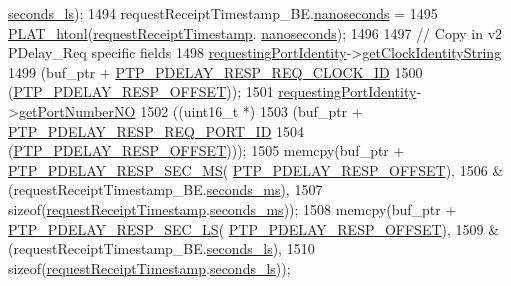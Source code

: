 \begin{DoxyCode}
      \hyperlink{class_timestamp_a2bf200e58cd268d8b86cf93c51500a44}{seconds\_ls});
1494     requestReceiptTimestamp\_BE.\hyperlink{class_timestamp_a78ae11d98fcfe738239d0a853d82c84a}{nanoseconds} =
1495         \hyperlink{linux_2src_2platform_8cpp_a8bf9e45ac3e41441f0e139139241c19d}{PLAT\_htonl}(\hyperlink{class_p_t_p_message_path_delay_resp_a981c3fe148ecddf9f1091675650ccd48}{requestReceiptTimestamp}.
      \hyperlink{class_timestamp_a78ae11d98fcfe738239d0a853d82c84a}{nanoseconds});
1496 
1497     \textcolor{comment}{// Copy in v2 PDelay\_Req specific fields}
1498     \hyperlink{class_p_t_p_message_path_delay_resp_a27e69c7fb521ebffca13229a7c4658ce}{requestingPortIdentity}->\hyperlink{class_port_identity_a2047fe8013d08f14ac579d604e2efd7e}{getClockIdentityString}
1499       (buf\_ptr + \hyperlink{avbts__message_8hpp_a9c01e5eff56f505aca3f6f3deb6c34f1}{PTP\_PDELAY\_RESP\_REQ\_CLOCK\_ID}
1500        (\hyperlink{avbts__message_8hpp_a7c20f0e32d4408c124fa9e115ab32cf3}{PTP\_PDELAY\_RESP\_OFFSET}));
1501     \hyperlink{class_p_t_p_message_path_delay_resp_a27e69c7fb521ebffca13229a7c4658ce}{requestingPortIdentity}->\hyperlink{class_port_identity_ae22242effe1001dc666522e6019fd494}{getPortNumberNO}
1502         ((uint16\_t *)
1503          (buf\_ptr + \hyperlink{avbts__message_8hpp_a1c5ac861894d1195aa57f60ef085798d}{PTP\_PDELAY\_RESP\_REQ\_PORT\_ID}
1504           (\hyperlink{avbts__message_8hpp_a7c20f0e32d4408c124fa9e115ab32cf3}{PTP\_PDELAY\_RESP\_OFFSET})));
1505     memcpy(buf\_ptr + \hyperlink{avbts__message_8hpp_a5afc93370bc70d23f95f2acbe53749d8}{PTP\_PDELAY\_RESP\_SEC\_MS}(
      \hyperlink{avbts__message_8hpp_a7c20f0e32d4408c124fa9e115ab32cf3}{PTP\_PDELAY\_RESP\_OFFSET}),
1506            &(requestReceiptTimestamp\_BE.\hyperlink{class_timestamp_a5d98378d782519e6f9c17db70f1620f0}{seconds\_ms}),
1507            \textcolor{keyword}{sizeof}(\hyperlink{class_p_t_p_message_path_delay_resp_a981c3fe148ecddf9f1091675650ccd48}{requestReceiptTimestamp}.\hyperlink{class_timestamp_a5d98378d782519e6f9c17db70f1620f0}{seconds\_ms}));
1508     memcpy(buf\_ptr + \hyperlink{avbts__message_8hpp_a8a6d2e369c19399ba34d40de83e3d318}{PTP\_PDELAY\_RESP\_SEC\_LS}(
      \hyperlink{avbts__message_8hpp_a7c20f0e32d4408c124fa9e115ab32cf3}{PTP\_PDELAY\_RESP\_OFFSET}),
1509            &(requestReceiptTimestamp\_BE.\hyperlink{class_timestamp_a2bf200e58cd268d8b86cf93c51500a44}{seconds\_ls}),
1510            \textcolor{keyword}{sizeof}(\hyperlink{class_p_t_p_message_path_delay_resp_a981c3fe148ecddf9f1091675650ccd48}{requestReceiptTimestamp}.\hyperlink{class_timestamp_a2bf200e58cd268d8b86cf93c51500a44}{seconds\_ls}));

\end{DoxyCode}

